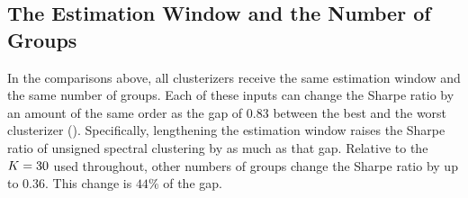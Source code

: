 
\subsection{The Estimation Window and the Number of Groups}
\label{sec:window}
In the comparisons above, all clusterizers receive the same estimation window and the same number of groups. Each of these inputs can change the Sharpe ratio by an amount of the same order as the gap of $0.83$ between the best and the worst clusterizer (). Specifically, lengthening the estimation window raises the Sharpe ratio of unsigned spectral clustering by as much as that gap. Relative to the $K = 30$ used throughout, other numbers of groups change the Sharpe ratio by up to $0.36$. This change is $44\%$ of the gap.

